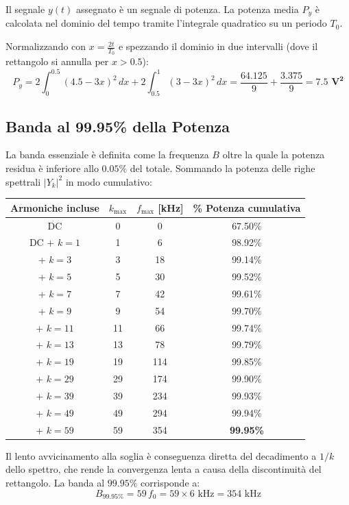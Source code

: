Il segnale $y(t)$ assegnato è un segnale di potenza. La potenza media $P_y$ è calcolata nel dominio del tempo tramite l'integrale quadratico su un periodo $T_0$.

Normalizzando con $x = \frac{2t}{T_0}$ e spezzando il dominio in due intervalli (dove il rettangolo si annulla per $x > 0.5$):
\[ P_y = 2 \int_{0}^{0.5} (4.5 - 3x)^2\, dx + 2\int_{0.5}^{1} (3 - 3x)^2\, dx = \frac{64.125}{9} + \frac{3.375}{9} = \mathbf{7.5 \text{ V}^2} \]

\subsection{Banda al 99.95\% della Potenza}
La banda essenziale è definita come la frequenza $B$ oltre la quale la potenza residua è inferiore allo $0.05\%$ del totale. Sommando la potenza delle righe spettrali $|Y_k|^2$ in modo cumulativo:

\begin{center}
    \begin{tabular}{cccc}
        \hline
        Armoniche incluse & $k_{\max}$ & $f_{\max}$ [kHz] & \% Potenza cumulativa \\
        \hline
        DC                & 0          & 0                & 67.50\%               \\
        DC + $k=1$        & 1          & 6                & 98.92\%               \\
        + $k=3$           & 3          & 18               & 99.14\%               \\
        + $k=5$           & 5          & 30               & 99.52\%               \\
        + $k=7$           & 7          & 42               & 99.61\%               \\
        + $k=9$           & 9          & 54               & 99.70\%               \\
        + $k=11$          & 11         & 66               & 99.74\%               \\
        + $k=13$          & 13         & 78               & 99.79\%               \\
        + $k=19$          & 19         & 114              & 99.85\%               \\
        + $k=29$          & 29         & 174              & 99.90\%               \\
        + $k=39$          & 39         & 234              & 99.93\%               \\
        + $k=49$          & 49         & 294              & 99.94\%               \\
        + $k=59$          & 59         & 354              & \textbf{99.95\%}      \\
        \hline
    \end{tabular}
\end{center}

Il lento avvicinamento alla soglia è conseguenza diretta del decadimento a $1/k$ dello spettro, che rende la convergenza lenta a causa della discontinuità del rettangolo. La banda al $99.95\%$ corrisponde a:
\[ \boxed{B_{99.95\%} = 59\, f_0 = 59 \times 6 \text{ kHz} = 354 \text{ kHz}} \]
